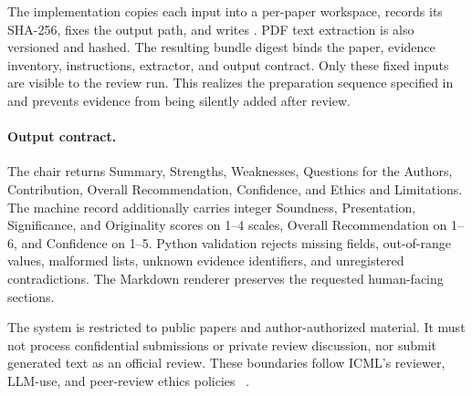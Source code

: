 \documentclass{article}
\begin{document}
The implementation copies each input into a per-paper workspace, records its
SHA-256, fixes the output path, and writes . PDF text
extraction is also versioned and hashed. The resulting bundle digest binds the
paper, evidence inventory, instructions, extractor, and output contract.
Only these fixed inputs are visible to the review run. This realizes the
preparation sequence specified in  and prevents evidence from
being silently added after review.

\paragraph{Output contract.}
The chair returns Summary, Strengths, Weaknesses, Questions for the Authors,
Contribution, Overall Recommendation, Confidence, and Ethics and Limitations.
The machine record additionally carries integer Soundness, Presentation,
Significance, and Originality scores on 1--4 scales, Overall Recommendation on
1--6, and Confidence on 1--5. Python validation rejects missing fields,
out-of-range values, malformed lists, unknown evidence identifiers, and
unregistered contradictions. The Markdown renderer preserves the requested
human-facing sections.

The system is restricted to public papers and author-authorized material. It
must not process confidential submissions or private review discussion, nor
submit generated text as an official review. These boundaries follow ICML's
reviewer, LLM-use, and peer-review ethics policies
~\cite{icml2026reviewer,icml2026llm,icml2026ethics}.
\end{document}

